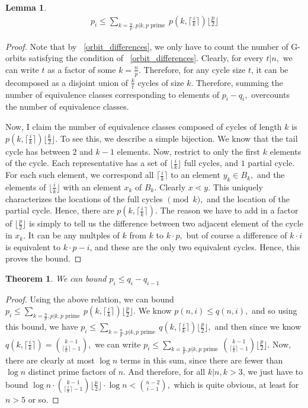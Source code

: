\documentclass{amsart}
\newtheorem{lem}[subsubsection]{Lemma}
\newtheorem{thm}[subsubsection]{Theorem}
\begin{document}
\begin{lem}
\begin{align*}
	p_i \leq \sum_{k = \frac{n}{p},p|k,p \text{ prime }}^{}p(k,\lceil \frac{i}{k}\rceil) \lfloor \frac{p}{2}\rfloor
\end{align*}
\end{lem}
\begin{proof}
Note that by ~\ref{orbit_differences}, we only have to count the number of G-orbits satisfying the condition of ~\ref{orbit_differences}. Clearly, for every $t|n,$ we can write $t$ as a factor of some $k = \frac{n}{p}.$ Therefore, for any cycle size $t$, it can be decomposed as a disjoint union of $\frac{k}{t}$ cycles of size $k.$ Therefore, summing the number of equivalence classes corresponding to elements of $p_i - q_i,$ overcounts the number of equivalence classes.

Now, I claim the number of equivalence classes composed of cycles of length $k$ is $p(k,\lceil \frac{i}{k}\rceil) \lfloor \frac{k}{2}\rfloor.$ To see this, we describe a simple bijection. We know that the tail cycle has between $2$ and $k-1$ elements. Now, restrict to only the first $k$ elements of the cycle. Each representative has a set of $\lfloor \frac{i}{k}\rfloor$ full cycles, and $1$ partial cycle. For each such element, we correspond all $\lceil \frac{i}{k}\rceil$ to an element $y_k \in B_k,$ and the elements of $\lfloor \frac{i}{k}\rfloor$ with an element $x_k$ of $B_k.$ Clearly $x \lessdot y.$ This uniquely characterizes the locations of the full cycles $\pmod k,$ and the location of the partial cycle. Hence, there are $p(k,\lceil \frac{i}{k}\rceil)$. The reason we have to add in a factor of $ \lfloor \frac{p}{2}\rfloor$ is simply to tell us the difference between two adjacent element of the cycle in $x_k.$ It can be any multples of $k$ from $k$ to $k \cdot p,$ but of course a difference of $k \cdot i$ is equivalent to $k \cdot p-i$, and these are the only two equivalent cycles. Hence, this proves the bound. 
\end{proof}

\begin{thm}
We can bound $p_i \leq q_i - q_{i-1}$
\end{thm}
\begin{proof}
Using the above relation, we can bound $p_i \leq \sum_{k = \frac{n}{p},p|k,p \text{ prime }}^{}p(k,\lceil \frac{i}{k}\rceil) \lfloor \frac{p}{2}\rfloor.$
We know $p(n,i) \leq q(n,i),$ and so using this bound, we have $p_i \leq \sum_{k = \frac{n}{p},p|k,p \text{ prime }}^{}q(k,\lceil \frac{i}{k}\rceil) \lfloor \frac{p}{2}\rfloor,$ and then since we know $q(k,\lceil \frac{i}{k}\rceil) = \binom {k-1} {\lceil \frac{i}{k}\rceil-1},$ we can write $p_i \leq \sum_{k = \frac{n}{p},p|k,p \text{ prime }}^{}\binom {k-1} {\lceil \frac{i}{k}\rceil-1}\lfloor \frac{p}{2}\rfloor.$ Now, there are clearly at most $\log n$ terms in this sum, since there are fewer than $\log n$ distinct prime factors of $n.$ And therefore, for all $k | n,k>3$, we just have to bound $\log n \cdot \binom {k-1} {\lceil \frac{i}{k}\rceil-1}\lfloor \frac{p}{2}\rfloor \cdot \log n < \binom {n-2}{i-1},$ which is quite obvious, at least for $n >5$ or so.
\end{proof}
\end{document}
